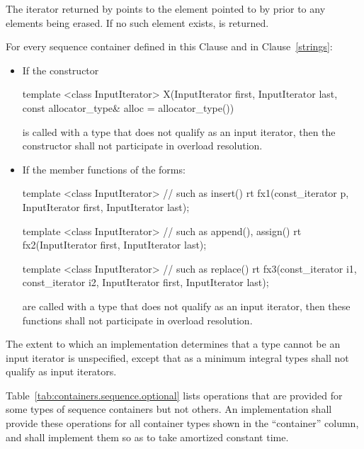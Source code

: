 \pnum
The iterator returned by
points to the element pointed to by
prior to any elements being erased.
If no such element exists,
is returned.

\pnum
For every sequence container defined in this Clause and in Clause~\ref{strings}:

\begin{itemize}
\item If the constructor

\begin{codeblock}
template <class InputIterator>
X(InputIterator first, InputIterator last,
  const allocator_type& alloc = allocator_type())
\end{codeblock}

is called with a type  that does not qualify as an input
iterator, then the constructor
shall not participate in overload resolution.

\item If the member functions of the forms:

\begin{codeblock}
template <class InputIterator>          // such as insert()
rt fx1(const_iterator p, InputIterator first, InputIterator last);

template <class InputIterator>          // such as append(), assign()
rt fx2(InputIterator first, InputIterator last);

template <class InputIterator>          // such as replace()
rt fx3(const_iterator i1, const_iterator i2, InputIterator first, InputIterator last);
\end{codeblock}

are called with a type  that does not qualify as an input
iterator, then these functions
shall not participate in overload resolution.
\end{itemize}

\pnum
The extent to which an implementation determines that a type cannot be an input
iterator is unspecified, except that as a minimum integral types shall not qualify
as input iterators.

\pnum
Table~\ref{tab:containers.sequence.optional} lists operations
that are provided for some types of
sequence containers but not others.
An implementation shall provide
these operations for all container types shown in the ``container''
column, and shall implement them so as to take amortized constant
time.

